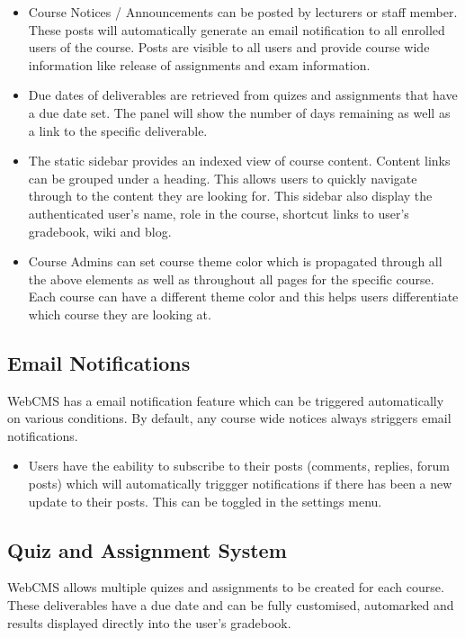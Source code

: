 \begin{itemize}
	\item Course Notices / Announcements can be posted by lecturers or staff member. These posts will automatically generate an email notification to all enrolled users of the course. Posts are visible to all users and provide course wide information like release of assignments and exam information.
	\item Due dates of deliverables are retrieved from quizes and assignments that have a due date set. The panel will show the number of days remaining as well as a link to the specific deliverable.
	\item The static sidebar provides an indexed view of course content. Content links can be grouped under a heading. This allows users to quickly navigate through to the content they are looking for. This sidebar also display the authenticated user's name, role in the course, shortcut links to user's gradebook, wiki and blog.
	\item Course Admins can set course theme color which is propagated through all the above elements as well as throughout all pages for the specific course. Each course can have a different theme color and this helps users differentiate which course they are looking at.
\end{itemize}

\subsection{Email Notifications}
WebCMS has a email notification feature which can be triggered automatically on various conditions. By default, any course wide notices always striggers email notifications.
\begin{itemize}
\item Users have the eability to subscribe to their posts (comments, replies, forum posts) which will automatically triggger notifications if there has been a new update to their posts. This can be toggled in the settings menu.
\end{itemize}

\subsection{Quiz and Assignment System}
WebCMS allows multiple quizes and assignments to be created for each course. These deliverables have a due date and can be fully customised, automarked and results displayed directly into the user's gradebook.


